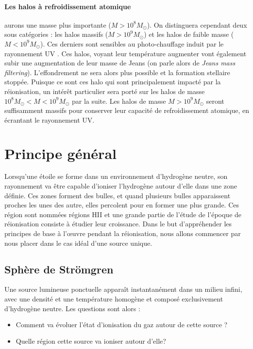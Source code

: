 \paragraph{Les halos à refroidissement atomique} aurons une masse plus importante ($M > 10^8 M_\odot$).
On distinguera cependant deux sous catégories : les halos massifs ($M > 10^9 M_\odot$) et les halos de faible masse ($M< 10^9 M_\odot$).
Ces derniers sont sensibles au photo-chauffage induit par le rayonnement UV \citep{1998ApJ...497...21M}.
Ces halos, voyant leur température augmenter vont également subir une augmentation de leur masse de Jeans (on parle alors de \textit{Jeans mass filtering}).
L'effondrement ne sera alors plus possible et la formation stellaire stoppée.
Puisque ce sont ces halo qui sont principalement impacté par la réionisation, un intérêt particulier sera porté sur les halos de masse $10^8 M_\odot < M< 10^9 M_\odot$ par la suite.
Les halos de masse $M > 10^9 M_\odot$ seront suffisamment massifs pour conserver leur capacité de refroidissement atomique, en écrantant le rayonnement UV.

\section{Principe général}

Lorsqu'une étoile se forme dans un environnement d'hydrogène neutre, son rayonnement va être capable d'ioniser l'hydrogène autour d'elle dans une zone définie.
Ces zones forment des bulles, et quand plusieurs bulles apparaissent proches les unes des autre, elles percolent pour en former une plus grande.
Ces région sont nommées régions HII et une grande partie de l'étude de l'époque de réionisation consiste à étudier leur croissance.
Dans le but d’appréhender les principes de base à l’œuvre pendant la réionisation, nous allons commencer par nous placer dans le cas idéal d'une source unique.

\subsection{Sphère de Strömgren}
\label{sec:stromgren}

Une source lumineuse ponctuelle apparaît instantanément dans un milieu infini, avec une densité et une température homogène et composé exclusivement d’hydrogène neutre.
Les questions sont alors : 
\begin{itemize}
\item Comment va évoluer l’état d'ionisation du gaz autour de cette source ?
\item Quelle région cette source va ioniser autour d'elle?
\end{itemize}

